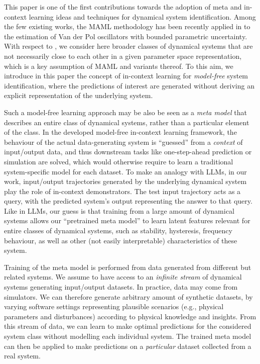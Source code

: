 \documentclass{article}
\begin{document}
 



This paper is one of the first contributions towards the
adoption of meta and in-context learning ideas and techniques for dynamical system identification. Among the few existing works,
the MAML methodology has been recently applied in \cite{chakrabarty2023meta} to the estimation of Van der Pol oscillators with bounded parametric uncertainty.
With respect to \cite{chakrabarty2023meta}, we consider here broader classes of dynamical systems that are not necessarily close to each other in a given parameter space representation, which is  a key assumption of MAML and variants thereof. To this aim, we introduce  in this paper the 
  concept of in-context  learning for \emph{model-free} system identification, where the predictions of interest  are generated  without deriving an explicit  representation of the underlying system. 
  
Such a model-free learning approach may be also be seen as a \emph{meta model} that describes an entire class of dynamical systems, rather than a particular element of the class. 
In the developed   model-free in-context  learning framework, the behaviour of the actual data-generating system is  ``guessed'' from a \emph{context} of input/output data, and thus  downstream tasks like one-step-ahead prediction or simulation are solved, which would otherwise require to learn a traditional system-specific model for each dataset.   To make an analogy with LLMs, in our work, input/output trajectories generated by the underlying dynamical system play the role of in-context demonstrators. The test input trajectory acts as a query, with the predicted system's output representing the answer to that query. Like in LLMs, our guess is that training from  a large amount of dynamical systems allows  our ``pretrained meta model'' to learn  latent features relevant for entire classes of dynamical systems, such as stability, hysteresis, frequency behaviour, as well as other (not easily interpretable) characteristics of these system. 

Training of the meta model is performed from data generated from different but related systems. We assume to have access to an \emph{infinite stream} of dynamical systems generating input/output  datasets. In practice,  data may come from  simulators. 
We can therefore generate arbitrary amount of 
synthetic datasets, by varying software settings representing plausible scenarios (e.g., physical parameters and disturbances) according to physical knowledge and insights. From this stream of data, we can learn to make optimal predictions for the considered system class without modelling each individual system. The trained meta model can then be applied to make predictions on a \emph{particular} dataset collected from a real system.
 
\end{document}
